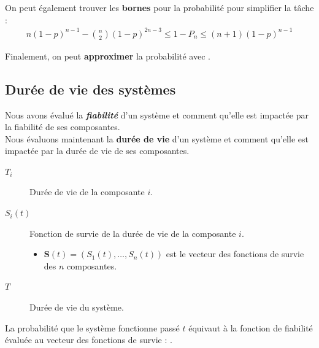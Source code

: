 \documentclass[10pt, french]{article}
\begin{document}
\begin{multicols*}{2}
\begin{definitionNOHFILLprop}
\tcbline

On peut également trouver les \textbf{bornes} pour la probabilité pour simplifier la tâche : 
\begin{align*}
	n(1 - p)^{n - 1} - \binom{n}{2} (1 - p)^{2n - 3}	
	\leq	1 - P_{n}		\leq	
	(n + 1) (1 - p)^{n - 1}
\end{align*}

\tcbline

Finalement, on peut \textbf{approximer} la probabilité avec .
\end{definitionNOHFILLprop}


\columnbreak
\subsection{Durée de vie des systèmes}
\begin{rappel_enhanced}[Contexte]
Nous avons évalué la \textbf{\textit{fiabilité}} d'un système et comment qu'elle est impactée par la fiabilité de ses composantes.\\

Nous évaluons maintenant la \textbf{durée de vie} d'un système et comment qu'elle est impactée par la durée de vie de ses composantes.
\end{rappel_enhanced}

\begin{distributions}[Notation]
\begin{description}
	\item[$T_{i}$]	Durée de vie de la composante $i$.
	\item[$S_{i}(t)$]	Fonction de survie de la durée de vie de la composante $i$.
		\begin{itemize}
		\item	$\bm{S}(t)	=	\left(S_{1}(t), \dots, S_{n}(t)\right)$ est le vecteur des fonctions de survie des $n$ composantes.
		\end{itemize}
	\item[$T$]	Durée de vie du système.
\end{description}
\end{distributions}

\begin{definitionNOHFILLprop}
La probabilité que le système fonctionne passé $t$ équivaut à la fonction de fiabilité évaluée au vecteur des fonctions de survie : .\\


\end{definitionNOHFILLprop}
\end{multicols*}
\end{document}
